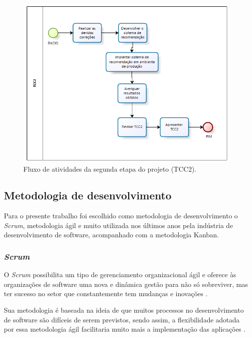 \begin{figure}[H]
    \centering
    \includegraphics[scale=0.8]{figuras/proposta/fluxo_atividade_tcc2.png}
    \caption[Fluxo de atividades da segunda etapa do projeto (TCC2)]{Fluxo de atividades da segunda etapa do projeto (TCC2).}
    \label{fig:fluxo_atividade_tcc2}
\end{figure}

\subsection{Metodologia de desenvolvimento}

Para o presente trabalho foi escolhido como metodologia de desenvolvimento o \textit{Scrum}, metodologia ágil e muito utilizada nos últimos anos pela indústria de desenvolvimento de software, acompanhado com a metodologia Kanban.

\subsubsection{\textit{Scrum}}
\label{section_scrum}

O \textit{Scrum} possibilita um tipo de gerenciamento organizacional ágil e oferece às organizações de software uma nova e dinâmica gestão para não só sobreviver, mas ter sucesso no setor que constantemente tem mudanças e inovações \cite{ijcf94}.

Sua metodologia é baseada na ideia de que muitos processos no desenvolvimento de software são difíceis de serem previstos, sendo assim, a flexibilidade adotada por essa metodologia ágil facilitaria muito mais a implementação das aplicações \cite{ijcf94}.

